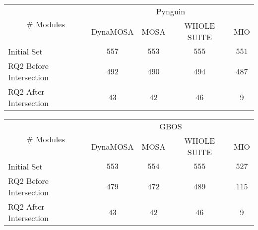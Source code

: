 
\begin{tabular}{lcccc}\toprule
    \multicolumn{1}{c}{\multirow{2}{*}{\# Modules}} & \multicolumn{4}{c}{Pynguin}                \\ \cmidrule(lr){2-5}
    \multicolumn{1}{c}{}                          & DynaMOSA & MOSA    & WHOLE SUITE & MIO     \\ \midrule
    Initial Set                                     & \(557\)  & \(553\) & \(555\)     & \(551\) \\
    RQ2 Before Intersection                         & \(492\)  & \(490\) & \(494\)     & \(487\) \\
    RQ2 After Intersection                          & \(43\)  & \(42\) & \(46\)     & \(9\) \\ 
    \bottomrule
  \end{tabular}
  \centering 
  \begin{tabular}{lcccc}\toprule
    \multicolumn{1}{c}{\multirow{2}{*}{\# Modules}} & \multicolumn{4}{c}{GBOS}                   \\ \cmidrule(lr){2-5}
    \multicolumn{1}{c}{}                          & DynaMOSA & MOSA    & WHOLE SUITE & MIO     \\ \midrule
    Initial Set                                     & \(553\)  & \(554\) & \(555\)     & \(527\) \\
    RQ2 Before Intersection                         & \(479\)  & \(472\) & \(489\)     & \(115\) \\
    RQ2 After Intersection                          & \(43\)  & \(42\) & \(46\)     & \(9\) \\ 
    \bottomrule
\end{tabular}
